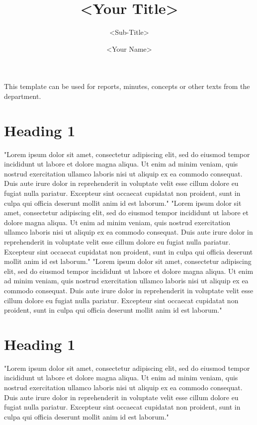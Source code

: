 \documentclass[a4paper,11pt]{article}
\begin{document}
\title{<Your Title>}
\subtitle{<Sub-Title>}
\author{<Your Name>}

\maketitle

\pt 


\noindent This template can be used for reports, minutes, concepts or other texts from the
department.
%

\section{Heading 1}
"Lorem ipsum dolor sit amet, consectetur adipiscing elit, sed do eiusmod tempor
incididunt ut labore et dolore magna aliqua. Ut enim ad minim veniam, quis
nostrud exercitation ullamco laboris nisi ut aliquip ex ea commodo consequat.
Duis aute irure dolor in reprehenderit in voluptate velit esse cillum dolore eu
fugiat nulla pariatur. Excepteur sint occaecat cupidatat non proident, sunt in
culpa qui officia deserunt mollit anim id est laborum." "Lorem ipsum dolor sit
amet, consectetur adipiscing elit, sed do eiusmod tempor incididunt ut labore et
dolore magna aliqua. Ut enim ad minim veniam, quis nostrud exercitation ullamco
laboris nisi ut aliquip ex ea commodo consequat. Duis aute irure dolor in
reprehenderit in voluptate velit esse cillum dolore eu fugiat nulla pariatur.
Excepteur sint occaecat cupidatat non proident, sunt in culpa qui officia
deserunt mollit anim id est laborum." "Lorem ipsum dolor sit amet, consectetur
adipiscing elit, sed do eiusmod tempor incididunt ut labore et dolore magna
aliqua. Ut enim ad minim veniam, quis nostrud exercitation ullamco laboris nisi
ut aliquip ex ea commodo consequat. Duis aute irure dolor in reprehenderit in
voluptate velit esse cillum dolore eu fugiat nulla pariatur. Excepteur sint
occaecat cupidatat non proident, sunt in culpa qui officia deserunt mollit anim
id est laborum."

\section{Heading 1}
"Lorem ipsum dolor sit amet, consectetur adipiscing elit, sed do eiusmod tempor
incididunt ut labore et dolore magna aliqua. Ut enim ad minim veniam, quis
nostrud exercitation ullamco laboris nisi ut aliquip ex ea commodo consequat.
Duis aute irure dolor in reprehenderit in voluptate velit esse cillum dolore eu
fugiat nulla pariatur. Excepteur sint occaecat cupidatat non proident, sunt in
culpa qui officia deserunt mollit anim id est laborum."
\end{document}
